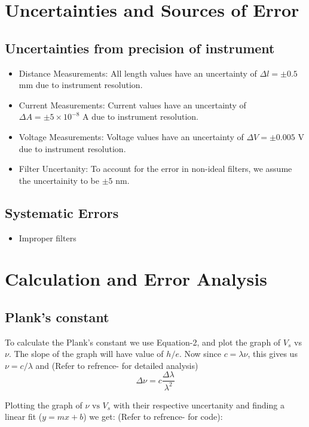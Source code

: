 \documentclass[%
 sor,
 jor,
 amsmath,amssymb,
 reprint,%
]{revtex4-2}
\begin{document}
\section{Uncertainties and Sources of Error}
\subsection{Uncertainties from precision of instrument}
\begin{itemize}
    \item Distance Measurements:
    All length values have an uncertainty of $\Delta l = \pm 0.5$ \si{\milli\meter} due to instrument resolution.    
\item Current Measurements: Current values have an uncertainty of $\Delta A = \pm 5\times10^{-8}$ \si{\ampere} due to instrument resolution. 
    \item Voltage Measurements: Voltage values have an uncertainty of $\Delta V = \pm 0.005$ \si{\volt} due to instrument resolution. 
    \item Filter Uncertanity: To account for the error in non-ideal filters, we assume the uncertainity to be $\pm 5$ nm.
\end{itemize}

\subsection{Systematic Errors}
\begin{itemize}
	\item Improper filters
\end{itemize}
\section{Calculation and Error Analysis}

\subsection{Plank's constant}
To calculate the Plank's constant we use Equation-2, and plot the graph of $V_s$ vs $\nu$. The slope of the graph will have value of $h/e$. Now since $c = \lambda\nu$, this gives us $\nu = c/\lambda$ and  (Refer to refrence-\cite{erroranalysis} for detailed analysis) $$\Delta \nu = c\frac{\Delta \lambda}{\lambda^2}$$

Plotting the graph of $\nu \text{ vs } V_s$ with their respective uncertanity and finding a linear fit ($y=mx+b$) we get:  (Refer to refrence-\cite{github_code} for code):
\end{document}
